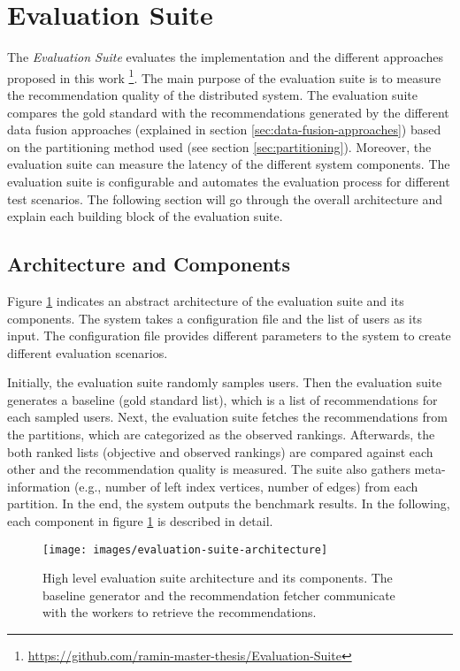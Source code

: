 \section{Evaluation Suite}
\label{sec:evaluation-suite}
The \emph{Evaluation Suite} evaluates the implementation and the different approaches proposed in this work \footnote{\url{https://github.com/ramin-master-thesis/Evaluation-Suite}}. The main purpose of the evaluation suite is to measure the recommendation quality of the distributed system. The evaluation suite compares the gold standard with the recommendations generated by the different data fusion approaches (explained in section \ref{sec:data-fusion-approaches}) based on the partitioning method used (see section \ref{sec:partitioning}). Moreover, the evaluation suite can measure the latency of the different system components. The evaluation suite is configurable and automates the evaluation process for different test scenarios. The following section will go through the overall architecture and explain each building block of the evaluation suite.


\subsection{Architecture and Components}
\label{sec:eval-suite-architecture-components}
Figure \ref{fig:evaluation-suite-architecture} indicates an abstract architecture of the evaluation suite and its components. The system takes a configuration file and the list of users as its input. The configuration file provides different parameters to the system to create different evaluation scenarios. 


Initially, the evaluation suite randomly samples users. Then the evaluation suite generates a baseline (gold standard list), which is a list of recommendations for each sampled users. Next, the evaluation suite fetches the recommendations from the partitions, which are categorized as the observed rankings. Afterwards, the both ranked lists (objective and observed rankings) are compared against each other and the recommendation quality is measured. The suite also gathers meta-information (e.g., number of left index vertices, number of edges) from each partition. In the end, the system outputs the benchmark results. In the following, each component in figure \ref{fig:evaluation-suite-architecture} is described in detail.


\begin{figure}[!htb]
    \centering
    \texttt{[image: images/evaluation-suite-architecture]}
    \caption{High level evaluation suite architecture and its components. The baseline generator and the recommendation fetcher communicate with the workers to retrieve the recommendations.}
    \label{fig:evaluation-suite-architecture}
\end{figure}


